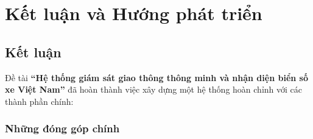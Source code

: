 ﻿\chapter{Kết luận và Hướng phát triển}
\label{ch:ket_luan}

\section{Kết luận}

Đề tài \textbf{``Hệ thống giám sát giao thông thông minh và nhận diện biển số xe Việt Nam''} đã hoàn thành việc xây dựng một hệ thống hoàn chỉnh với các thành phần chính:

\subsection{Những đóng góp chính}


